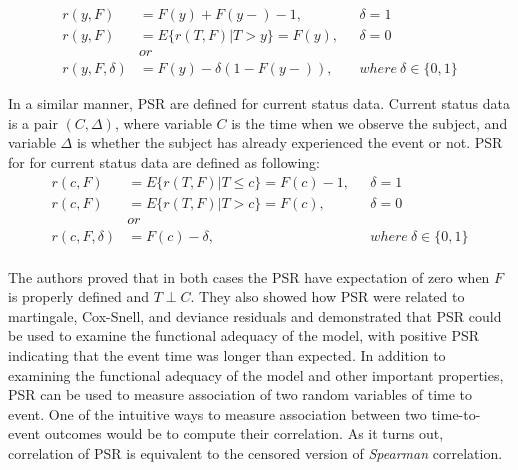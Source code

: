 \documentclass[]{article}
\begin{document}
	$$
	\begin{aligned}
		r(y, F) &= F(y) + F(y-) - 1,~~~&\delta = 1 \\
		r(y, F) &= E\{r(T,F)|T>y\} = F(y) ,~~~&\delta = 0 \\
		&or\\
    r(y, F, \delta) &= F(y) - \delta(1 - F(y-)),~~~&where~\delta \in \{0,1\}
	\end{aligned}
	$$

In a similar manner, PSR are defined for current status data. Current status data is a pair $(C, \Delta)$, where variable $C$ is the time when we observe the subject, and variable $\Delta$ is whether the subject has already experienced the event or not. PSR for for current status data are defined as following:
	$$
	\begin{aligned}
		r(c, F) &= E\{r(T,F)|T\leq c\} = F(c) - 1,~~~&\delta = 1 \\
		r(c, F) &= E\{r(T,F)|T>c\} = F(c) ,~~~&\delta = 0 \\
		&or\\
    r(c, F, \delta) &= F(c) - \delta,~~~&where~\delta \in \{0,1\}\\
	\end{aligned}
	$$

The authors proved that in both cases the PSR have expectation of zero when $F$ is properly defined and $T \perp C$. They also showed how PSR were related to martingale, Cox-Snell, and deviance residuals and demonstrated that PSR could be used to examine the functional adequacy of the model, with positive PSR indicating that the event time was longer than expected. In addition to examining the functional adequacy of the model and other important properties, PSR can be used to measure association of two random variables of time to event. One of the intuitive ways to measure association between two time-to-event outcomes would be to compute their correlation. As it turns out, correlation of PSR is equivalent to the censored version of \emph{Spearman} correlation.
\end{document}

